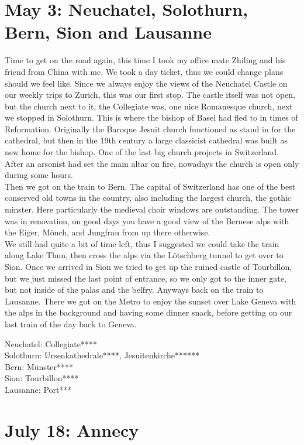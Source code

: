 \section{May 3: Neuchatel, Solothurn, Bern, Sion and Lausanne}
\label{2008:Swisstrip}

Time to get on the road again, this time I took my office mate Zhiling and his friend from China with me. We took a day ticket, thus we could change plans should we feel like. Since we always enjoy the views of the Neuchatel Castle on our weekly trips to Zurich, this was our first stop. The castle itself was not open, but the church next to it, the Collegiate was, one nice Romanesque church, next we stopped in Solothurn. This is where the bishop of Basel had fled to in times of Reformation. Originally the Baroque Jesuit church functioned as stand in for the cathedral, but then in the 19th century a large classicist cathedral was built as new home for the bishop. One of the last big church projects in Switzerland. After an arsonist had set the main altar on fire, nowadays the church is open only during some hours.\\
Then we got on the train to Bern. The capital of Switzerland has one of the best conserved old towns in the country, also including the largest church, the gothic minster. Here particularly the medieval choir windows are outstanding. The tower was in renovation, on good days you have a good view of the Bernese alps with the Eiger, M\"onch, and Jungfrau from up there otherwise.\\
We still had quite a bit of time left, thus I suggested we could take the train along Lake Thun, then cross the alps via the L\"otschberg tunnel to get over to Sion. Once we arrived in Sion we tried to get up the ruined castle of Tourbillon, but we just missed the last point of entrance, so we only got to the inner gate, but not inside of the palas and the belfry. Anyways back on the train to Lausanne. There we got on the Metro to enjoy the sunset over Lake Geneva with the alps in the background and having some dinner snack, before getting on our last train of the day back to Geneva.

Neuchatel: Collegiate****\\
Solothurn: Ursenkathedrale****, Jesuitenkirche******\\
Bern: M\"unster****\\
Sion: Tourbillon****\\
Lausanne: Port***

\section{July 18: Annecy}
\label{2008:Annecy}

